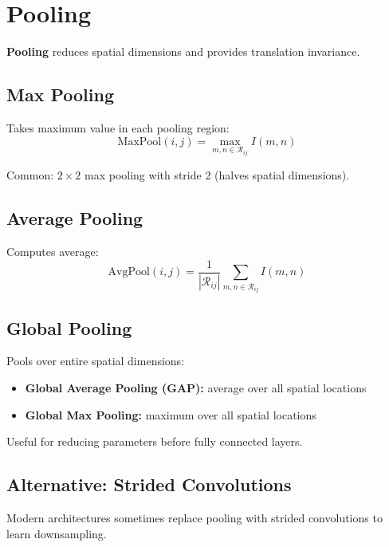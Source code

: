
\section{Pooling}
\label{sec:pooling}

\textbf{Pooling} reduces spatial dimensions and provides translation invariance.

\subsection{Max Pooling}

Takes maximum value in each pooling region:
\begin{equation}
\text{MaxPool}(i,j) = \max_{m,n \in \mathcal{R}_{ij}} I(m,n)
\end{equation}

Common: $2 \times 2$ max pooling with stride 2 (halves spatial dimensions).

\subsection{Average Pooling}

Computes average:
\begin{equation}
\text{AvgPool}(i,j) = \frac{1}{|\mathcal{R}_{ij}|} \sum_{m,n \in \mathcal{R}_{ij}} I(m,n)
\end{equation}

\subsection{Global Pooling}

Pools over entire spatial dimensions:
\begin{itemize}
    \item \textbf{Global Average Pooling (GAP):} average over all spatial locations
    \item \textbf{Global Max Pooling:} maximum over all spatial locations
\end{itemize}

Useful for reducing parameters before fully connected layers.

\subsection{Alternative: Strided Convolutions}

Modern architectures sometimes replace pooling with strided convolutions to learn downsampling.

